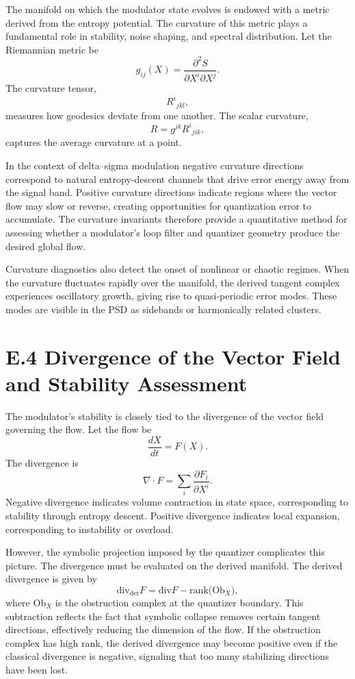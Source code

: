 The manifold on which the modulator state evolves is endowed with a metric derived from the entropy potential. The curvature of this metric plays a fundamental role in stability, noise shaping, and spectral distribution. Let the Riemannian metric be
\[
g_{ij}(X) = \frac{\partial^{2} S}{\partial X^{i}\partial X^{j}}.
\]
The curvature tensor,
\[
R^{i}{}_{jkl},
\]
measures how geodesics deviate from one another. The scalar curvature,
\[
R = g^{jk} R^{i}{}_{jik},
\]
captures the average curvature at a point.

In the context of delta–sigma modulation negative curvature directions correspond to natural entropy-descent channels that drive error energy away from the signal band. Positive curvature directions indicate regions where the vector flow may slow or reverse, creating opportunities for quantization error to accumulate. The curvature invariants therefore provide a quantitative method for assessing whether a modulator’s loop filter and quantizer geometry produce the desired global flow.

Curvature diagnostics also detect the onset of nonlinear or chaotic regimes. When the curvature fluctuates rapidly over the manifold, the derived tangent complex experiences oscillatory growth, giving rise to quasi-periodic error modes. These modes are visible in the PSD as sidebands or harmonically related clusters.

\section{E.4 Divergence of the Vector Field and Stability Assessment}

The modulator’s stability is closely tied to the divergence of the vector field governing the flow. Let the flow be
\[
\frac{dX}{dt} = F(X).
\]
The divergence is
\[
\nabla\cdot F = \sum_{i} \frac{\partial F_{i}}{\partial X^{i}}.
\]
Negative divergence indicates volume contraction in state space, corresponding to stability through entropy descent. Positive divergence indicates local expansion, corresponding to instability or overload.

However, the symbolic projection imposed by the quantizer complicates this picture. The divergence must be evaluated on the derived manifold. The derived divergence is given by
\[
\mathrm{div}_{\mathrm{der}} F
= \mathrm{div} F - \mathrm{rank}\bigl(\mathrm{Ob}_{X}\bigr),
\]
where \(\mathrm{Ob}_{X}\) is the obstruction complex at the quantizer boundary. This subtraction reflects the fact that symbolic collapse removes certain tangent directions, effectively reducing the dimension of the flow. If the obstruction complex has high rank, the derived divergence may become positive even if the classical divergence is negative, signaling that too many stabilizing directions have been lost.

